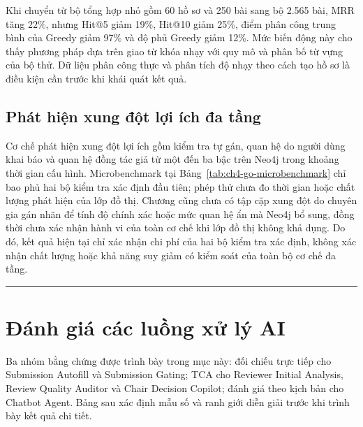 Khi chuyển từ bộ tổng hợp nhỏ gồm 60 hồ sơ và 250 bài sang bộ 2.565 bài, MRR tăng 22\%, nhưng Hit@5 giảm 19\%, Hit@10 giảm 25\%, điểm phân công trung bình của Greedy giảm 97\% và độ phủ Greedy giảm 12\%. Mức biến động này cho thấy phương pháp dựa trên giao từ khóa nhạy với quy mô và phân bố từ vựng của bộ thử. Dữ liệu phân công thực và phân tích độ nhạy theo cách tạo hồ sơ là điều kiện cần trước khi khái quát kết quả.

\subsection{Phát hiện xung đột lợi ích đa tầng}

Cơ chế phát hiện xung đột lợi ích gồm kiểm tra tự gán, quan hệ do người dùng khai báo và quan hệ đồng tác giả từ một đến ba bậc trên Neo4j trong khoảng thời gian cấu hình. Microbenchmark tại Bảng~\ref{tab:ch4-go-microbenchmark} chỉ bao phủ hai bộ kiểm tra xác định đầu tiên; phép thử chưa đo thời gian hoặc chất lượng phát hiện của lớp đồ thị. Chương cũng chưa có tập cặp xung đột do chuyên gia gán nhãn để tính độ chính xác hoặc mức quan hệ ẩn mà Neo4j bổ sung, đồng thời chưa xác nhận hành vi của toàn cơ chế khi lớp đồ thị không khả dụng. Do đó, kết quả hiện tại chỉ xác nhận chi phí của hai bộ kiểm tra xác định, không xác nhận chất lượng hoặc khả năng suy giảm có kiểm soát của toàn bộ cơ chế đa tầng.

\par\noindent\rule{\textwidth}{0.4pt}\par

\section{Đánh giá các luồng xử lý AI}

Ba nhóm bằng chứng được trình bày trong mục này: đối chiếu trực tiếp cho Submission Autofill và Submission Gating; TCA cho Reviewer Initial Analysis, Review Quality Auditor và Chair Decision Copilot; đánh giá theo kịch bản cho Chatbot Agent. Bảng sau xác định mẫu số và ranh giới diễn giải trước khi trình bày kết quả chi tiết.

